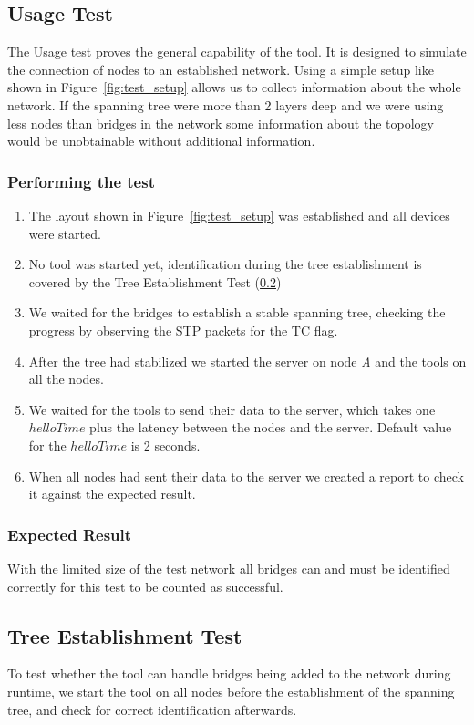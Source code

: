 \subsection{Usage Test}
\label{usage_test}
The Usage test proves the general capability of the tool.
It is designed to simulate the connection of nodes to an established network.
Using a simple setup like shown in Figure~\ref{fig:test_setup} allows us to collect information about the whole network.
If the spanning tree were more than 2 layers deep and we were using less nodes than bridges in the network some information about the topology would be unobtainable without additional information.

\subsubsection{Performing the test}
\begin{enumerate}
    \item The layout shown in Figure~\ref{fig:test_setup} was established and all devices were started.
    \item No tool was started yet, identification during the tree establishment is covered by the Tree Establishment Test (\ref{tree_est_test})
    \item We waited for the bridges to establish a stable spanning tree, checking the progress by observing the STP packets for the TC flag.
    \item After the tree had stabilized we started the server on node \textit{A} and the tools on all the nodes.
    \item We waited for the tools to send their data to the server, which takes one $helloTime$ plus the latency between the nodes and the server. Default value for the $helloTime$ is 2 seconds.
    \item When all nodes had sent their data to the server we created a report to check it against the expected result.
\end{enumerate}
\subsubsection{Expected Result}
With the limited size of the test network all bridges can and must be identified correctly for this test to be counted as successful.

\subsection{Tree Establishment Test}
\label{tree_est_test}
To test whether the tool can handle bridges being added to the network during runtime, we start the tool on all nodes before the establishment of the spanning tree, and check for correct identification afterwards.

